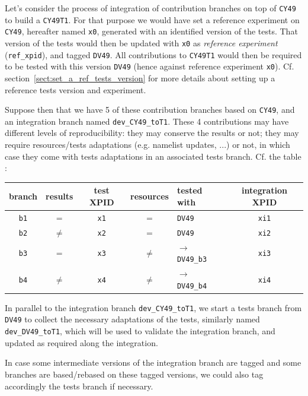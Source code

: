 \documentclass[a4paper,10pt,twoside]{article}
\begin{document}
\begin{appendix}
Let's consider the process of integration of contribution branches on top of \texttt{CY49} to build a \texttt{CY49T1}.
For that purpose we would have set a reference experiment on \texttt{CY49}, hereafter named \texttt{x0}, generated with an identified version of the tests. That version of the tests would then be updated with \texttt{x0} as \textit{reference experiment} (\texttt{ref\_xpid}), and tagged \texttt{DV49}.
All contributions to \texttt{CY49T1} would then be required to be tested with this version \texttt{DV49} (hence against reference experiment \texttt{x0}). Cf. section~\ref{sect:set_a_ref_tests_version} for more details about setting up a reference tests version and experiment.

Suppose then that we have 5 of these contribution branches based on \texttt{CY49}, and an integration branch named \texttt{dev\_CY49\_toT1}. These 4 contributions may have different levels of reproducibility: they may conserve the results or not; they may require resources/tests adaptations (e.g. namelist updates, ...) or not, in which case they come with tests adaptations in an associated tests branch. Cf. the table :\\

\begin{center}
\begin{tabular}{|c|c|c|c|l|c|}
\hline
 branch & results & test XPID & resources & tested with & integration XPID\\
 \hline
 \texttt{b1} & $=$ & \texttt{x1} & $=$ & \texttt{DV49} & \texttt{xi1}\\
 \texttt{b2} & $\neq$ & \texttt{x2} & $=$ & \texttt{DV49} & \texttt{xi2}\\
 \texttt{b3} & $=$ & \texttt{x3} & $\neq$ & $\rightarrow$ \texttt{DV49\_b3} & \texttt{xi3}\\
 \texttt{b4} & $\neq$ & \texttt{x4} & $\neq$ & $\rightarrow$ \texttt{DV49\_b4} & \texttt{xi4}\\
 \hline
\end{tabular}
\end{center}

\noindent In parallel to the integration branch \texttt{dev\_CY49\_toT1}, we start a tests branch from \texttt{DV49} to collect the necessary adaptations of the tests, similarly named \texttt{dev\_DV49\_toT1}, which will be used to validate the integration branch, and updated as required along the integration.

In case some intermediate versions of the integration branch are tagged and some branches are based/rebased on these tagged versions, we could also tag accordingly the tests branch if necessary.\\


\end{appendix}
\end{document}

